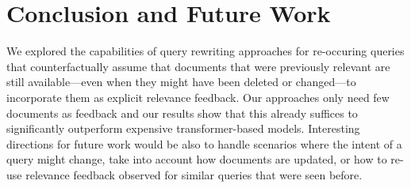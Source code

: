 \section{Conclusion and Future Work}

We explored the capabilities of query rewriting approaches for re-occuring queries that counterfactually assume that documents that were previously relevant are still available---even when they might have been deleted or changed---to incorporate them as explicit relevance feedback. Our approaches only need few documents as feedback and our results show that this already suffices to significantly outperform expensive transformer-based models. Interesting directions for future work would be also to handle scenarios where the intent of a query might change, take into account how documents are updated, or how to re-use relevance feedback observed for similar queries that were seen before.